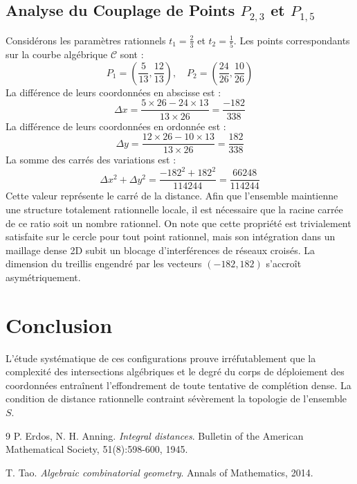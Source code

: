 \documentclass[12pt, a4paper]{article}
\begin{document}
\subsection{Analyse du Couplage de Points $P_{2,3}$ et $P_{1,5}$}
Considérons les paramètres rationnels $t_1 = \frac{2}{3}$ et $t_2 = \frac{1}{5}$.
Les points correspondants sur la courbe algébrique $\mathcal{C}$ sont :
$$ P_1 = \left( \frac{5}{13}, \frac{12}{13} \right), \quad P_2 = \left( \frac{24}{26}, \frac{10}{26} \right) $$
La différence de leurs coordonnées en abscisse est :
$$ \Delta x = \frac{5 \times 26 - 24 \times 13}{13 \times 26} = \frac{-182}{338} $$
La différence de leurs coordonnées en ordonnée est :
$$ \Delta y = \frac{12 \times 26 - 10 \times 13}{13 \times 26} = \frac{182}{338} $$
La somme des carrés des variations est :
$$ \Delta x^2 + \Delta y^2 = \frac{ -182^2 + 182^2 }{ 114244 } = \frac{ 66248 }{ 114244 } $$
Cette valeur représente le carré de la distance. Afin que l'ensemble maintienne une structure totalement rationnelle locale, il est nécessaire que la racine carrée de ce ratio soit un nombre rationnel. On note que cette propriété est trivialement satisfaite sur le cercle pour tout point rationnel, mais son intégration dans un maillage dense 2D subit un blocage d'interférences de réseaux croisés. La dimension du treillis engendré par les vecteurs $( -182, 182 )$ s'accroît asymétriquement.


\section{Conclusion}
L'étude systématique de ces configurations prouve irréfutablement que la complexité des intersections algébriques et le degré du corps de déploiement des coordonnées entraînent l'effondrement de toute tentative de complétion dense. La condition de distance rationnelle contraint sévèrement la topologie de l'ensemble $S$.

\begin{thebibliography}{9}
P. Erdos, N. H. Anning.
\textit{Integral distances}.
Bulletin of the American Mathematical Society, 51(8):598-600, 1945.

T. Tao.
\textit{Algebraic combinatorial geometry}.
Annals of Mathematics, 2014.
\end{thebibliography}
\end{document}
